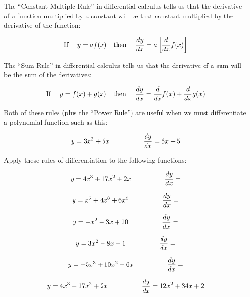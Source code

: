 

The ``Constant Multiple Rule'' in differential calculus tells us that the derivative of a function multiplied by a constant will be that constant multiplied by the derivative of the function:

$$\hbox{If \hskip 10pt} y = a f(x) \hbox{\hskip 10pt then \hskip 10pt} {dy \over dx} = a \left[ {d \over dx} f(x) \right]$$

\vskip 10pt

The ``Sum Rule'' in differential calculus tells us that the derivative of a sum will be the sum of the derivatives:

$$\hbox{If \hskip 10pt} y = f(x) + g(x) \hbox{\hskip 10pt then \hskip 10pt} {dy \over dx} = {d \over dx} f(x) + {d \over dx} g(x)$$

\vskip 10pt

Both of these rules (plus the ``Power Rule'') are useful when we must differentiate a polynomial function such as this:

$$y = 3x^2 + 5x  \hbox{\hskip 50pt} {dy \over dx} = 6x + 5$$

\vskip 10pt

Apply these rules of differentiation to the following functions:

\vskip 20pt

$$y = 4x^3 + 17x^2 + 2x \hbox{\hskip 50pt} {dy \over dx} = $$

\vskip 20pt

$$y = x^5 + 4x^3 + 6x^2 \hbox{\hskip 50pt} {dy \over dx} = $$

\vskip 20pt

$$y = -x^2 + 3x + 10 \hbox{\hskip 50pt} {dy \over dx} = $$

\vskip 20pt

$$y = 3x^2 - 8x - 1 \hbox{\hskip 50pt} {dy \over dx} = $$

\vskip 20pt

$$y = -5x^3 + 10x^2 - 6x \hbox{\hskip 50pt} {dy \over dx} = $$







$$y = 4x^3 + 17x^2 + 2x \hbox{\hskip 50pt} {dy \over dx} = 12x^2 + 34x + 2$$

